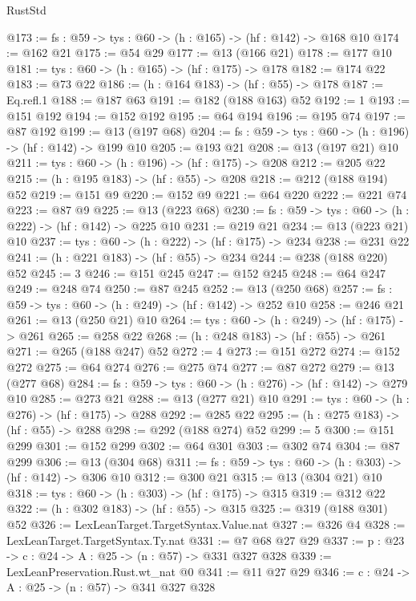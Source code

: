 \begin{lexlean}{RustStd}
\begin{coremodule}
@173 := {fs : @59} -> {tys : @60} -> (h : @165) -> (hf : @142) -> @168 @10
@174 := @162 @21
@175 := @54 @29
@177 := @13 (@166 @21)
@178 := @177 @10
@181 := {tys : @60} -> (h : @165) -> (hf : @175) -> @178
@182 := @174 @22
@183 := @73 @22
@186 := (h : @164 @183) -> (hf : @55) -> @178
@187 := Eq.refl.{1}
@188 := @187 @63
@191 := @182 (@188 @163) @52
@192 := 1
@193 := @151 @192
@194 := @152 @192
@195 := @64 @194
@196 := @195 @74
@197 := @87 @192
@199 := @13 (@197 @68)
@204 := {fs : @59} -> {tys : @60} -> (h : @196) -> (hf : @142) -> @199 @10
@205 := @193 @21
@208 := @13 (@197 @21) @10
@211 := {tys : @60} -> (h : @196) -> (hf : @175) -> @208
@212 := @205 @22
@215 := (h : @195 @183) -> (hf : @55) -> @208
@218 := @212 (@188 @194) @52
@219 := @151 @9
@220 := @152 @9
@221 := @64 @220
@222 := @221 @74
@223 := @87 @9
@225 := @13 (@223 @68)
@230 := {fs : @59} -> {tys : @60} -> (h : @222) -> (hf : @142) -> @225 @10
@231 := @219 @21
@234 := @13 (@223 @21) @10
@237 := {tys : @60} -> (h : @222) -> (hf : @175) -> @234
@238 := @231 @22
@241 := (h : @221 @183) -> (hf : @55) -> @234
@244 := @238 (@188 @220) @52
@245 := 3
@246 := @151 @245
@247 := @152 @245
@248 := @64 @247
@249 := @248 @74
@250 := @87 @245
@252 := @13 (@250 @68)
@257 := {fs : @59} -> {tys : @60} -> (h : @249) -> (hf : @142) -> @252 @10
@258 := @246 @21
@261 := @13 (@250 @21) @10
@264 := {tys : @60} -> (h : @249) -> (hf : @175) -> @261
@265 := @258 @22
@268 := (h : @248 @183) -> (hf : @55) -> @261
@271 := @265 (@188 @247) @52
@272 := 4
@273 := @151 @272
@274 := @152 @272
@275 := @64 @274
@276 := @275 @74
@277 := @87 @272
@279 := @13 (@277 @68)
@284 := {fs : @59} -> {tys : @60} -> (h : @276) -> (hf : @142) -> @279 @10
@285 := @273 @21
@288 := @13 (@277 @21) @10
@291 := {tys : @60} -> (h : @276) -> (hf : @175) -> @288
@292 := @285 @22
@295 := (h : @275 @183) -> (hf : @55) -> @288
@298 := @292 (@188 @274) @52
@299 := 5
@300 := @151 @299
@301 := @152 @299
@302 := @64 @301
@303 := @302 @74
@304 := @87 @299
@306 := @13 (@304 @68)
@311 := {fs : @59} -> {tys : @60} -> (h : @303) -> (hf : @142) -> @306 @10
@312 := @300 @21
@315 := @13 (@304 @21) @10
@318 := {tys : @60} -> (h : @303) -> (hf : @175) -> @315
@319 := @312 @22
@322 := (h : @302 @183) -> (hf : @55) -> @315
@325 := @319 (@188 @301) @52
@326 := LexLeanTarget.TargetSyntax.Value.nat
@327 := @326 @4
@328 := LexLeanTarget.TargetSyntax.Ty.nat
@331 := @7 @68 @27 @29
@337 := {p : @23} -> {c : @24} -> {A : @25} -> (n : @57) -> @331 @327 @328
@339 := LexLeanPreservation.Rust.wt_nat @0
@341 := @11 @27 @29
@346 := {c : @24} -> {A : @25} -> (n : @57) -> @341 @327 @328

\end{coremodule}
\end{lexlean}
